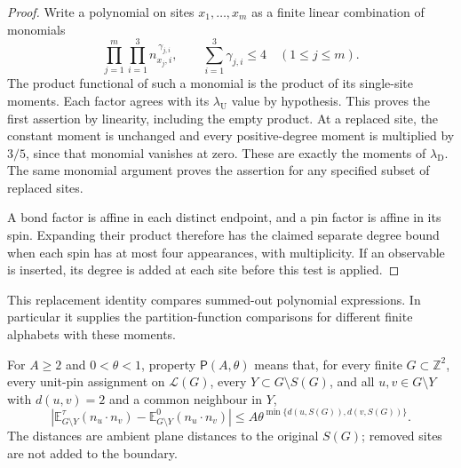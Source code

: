 \begin{proof}
Write a polynomial on sites \(x_1,\ldots,x_m\) as a finite linear
combination of monomials
\[
 \prod_{j=1}^m\prod_{i=1}^3 n_{x_j,i}^{\,\gamma_{j,i}},
 \qquad \sum_{i=1}^3\gamma_{j,i}\le4\quad(1\le j\le m).
\]
The product functional of such a monomial is the product of its
single-site moments. Each factor agrees with its
\(\lambda_{\mathrm U}\) value by hypothesis. This proves the first
assertion by linearity, including the empty product.
At a replaced site, the constant moment is unchanged and every
positive-degree moment is multiplied by \(3/5\), since that
monomial vanishes at zero. These are exactly the moments of
\(\lambda_{\mathrm D}\). The same monomial argument proves the
assertion for any specified subset of replaced sites.

A bond factor is affine in each distinct endpoint, and a pin factor
is affine in its spin. Expanding their product therefore has the
claimed separate degree bound when each spin has at most four
appearances, with multiplicity. If an observable is inserted, its
degree is added at each site before this test is applied.
\end{proof}

This replacement identity compares summed-out polynomial expressions.
In particular it supplies the partition-function comparisons for
different finite alphabets with these moments.

\begin{definition}[(P)]\label{h:P}
For \(A\ge2\) and \(0<\theta<1\), property \(\mathsf P(A,\theta)\)
means that, for every finite \(G\subset\mathbb Z^2\), every unit-pin
assignment on \(\mathcal L(G)\), every
\(Y\subset G\setminus S(G)\), and all \(u,v\in G\setminus Y\) with
\(d(u,v)=2\) and a common neighbour in \(Y\),
\[
 \left|\mathbb E^\tau_{G\setminus Y}(n_u\cdot n_v)
             -\mathbb E^0_{G\setminus Y}(n_u\cdot n_v)\right|
 \le A\theta^{\min\{d(u,S(G)),d(v,S(G))\}} .
\]
The distances are ambient plane distances to the original \(S(G)\);
removed sites are not added to the boundary.
\end{definition}


